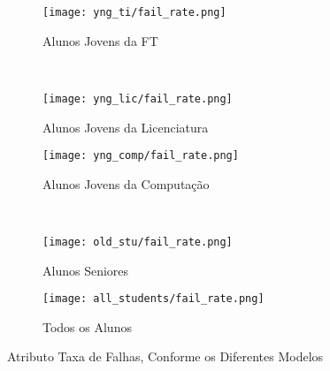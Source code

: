 \clearpage
\begin{figure}[!ht]
    \centering
    \begin{subfigure}[b]{0.48\textwidth}
        \centering
        \texttt{[image: yng\_ti/fail\_rate.png]}
        \caption{Alunos Jovens da FT}
    \end{subfigure}
    ~
    \begin{subfigure}[b]{0.48\textwidth}
        \centering
        \texttt{[image: yng\_lic/fail\_rate.png]}
        \caption{Alunos Jovens da Licenciatura}
    \end{subfigure}

    \begin{subfigure}[b]{0.48\textwidth}
        \centering
        \texttt{[image: yng\_comp/fail\_rate.png]}
        \caption{Alunos Jovens da Computação}
    \end{subfigure}
    ~
    \begin{subfigure}[b]{0.48\textwidth}
        \centering
        \texttt{[image: old\_stu/fail\_rate.png]}
        \caption{Alunos Seniores}
    \end{subfigure}

    \begin{subfigure}[b]{0.48\textwidth}
        \centering
        \texttt{[image: all\_students/fail\_rate.png]}
        \caption{Todos os Alunos}
    \end{subfigure}
    \caption{Atributo Taxa de Falhas, Conforme os Diferentes Modelos}
\end{figure}

